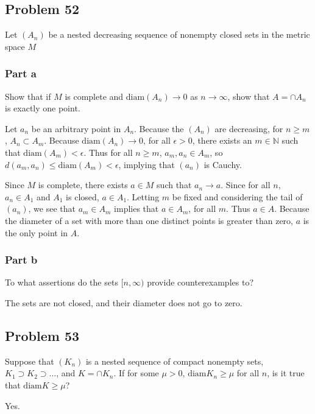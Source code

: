 \documentclass{article}
\newcommand{\diam}{\text{diam}}
\begin{document}
\subsection*{Problem 52}

Let $(A_n)$ be a nested decreasing sequence of nonempty closed sets in the metric space $M$

\subsubsection*{Part a}

Show that if $M$ is complete and $\text{diam}(A_n) \rightarrow 0$ as $n \rightarrow \infty$, show that $A = \cap A_n$ is exactly one point.

Let $a_n$ be an arbitrary point in $A_n$. Because the $(A_n)$ are decreasing, for $n \geq m$, $A_n \subset A_m$. Because $\text{diam}(A_n) \rightarrow 0$, for all $\epsilon > 0$, there exists an $m \in \mathbb{N}$ such that $\text{diam}(A_m) < \epsilon$. Thus for all $n \geq m$, $a_m, a_n \in A_m$, so $d(a_m, a_n) \leq \text{diam}(A_m) < \epsilon$, implying that $(a_n)$ is Cauchy.

Since $M$ is complete, there exists $a \in M$ such that $a_n \rightarrow a$. Since for all $n$, $a_n \in A_1$ and $A_1$ is closed, $a \in A_1$. Letting $m$ be fixed and considering the tail of $(a_n)$, we see that $a_m \in A_m$ implies that $a \in A_m$, for all $m$. Thus $a \in A$. Because the diameter of a set with more than one distinct points is greater than zero, $a$ is the only point in $A$.

\subsubsection*{Part b}

To what assertions do the sets $[n, \infty)$ provide counterexamples to?

The sets are not closed, and their diameter does not go to zero.

\subsection*{Problem 53}

Suppose that $(K_n)$ is a nested sequence of compact nonempty sets, $K_1 \supset K_2 \supset \dots $, and $K = \cap K_n$. If for some $\mu > 0$, $\diam K_n \geq \mu$ for all $n$, is it true that $\diam K \geq \mu$?

Yes.
\end{document}
